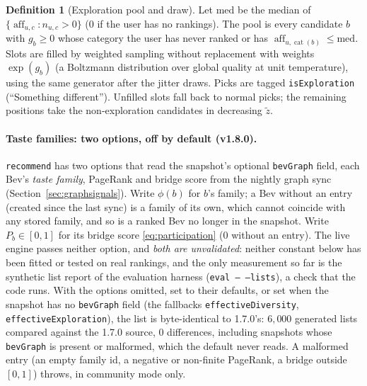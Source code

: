 \documentclass[11pt]{article}
\DeclareMathOperator{\aff}{aff}
\DeclareMathOperator{\cat}{cat}
\newcommand{\code}[1]{\texttt{#1}}
\theoremstyle{plain}
\theoremstyle{definition}
\newtheorem{definition}[theorem]{Definition}
\theoremstyle{remark}
\begin{document}
\begin{definition}[Exploration pool and draw]
Let $\mathrm{med}$ be the median of $\{\aff_{u,c} : n_{u,c} > 0\}$ ($0$ if the user has no rankings). The pool is every candidate $b$ with $g_b \ge 0$ whose category the user has never ranked or has $\aff_{u,\cat(b)} \le \mathrm{med}$. Slots are filled by weighted sampling without replacement with weights $\exp(g_b)$ (a Boltzmann distribution over global quality at unit temperature), using the same generator after the jitter draws. Picks are tagged \code{isExploration} (``Something different''). Unfilled slots fall back to normal picks; the remaining positions take the non-exploration candidates in decreasing $\tilde z$.
\end{definition}

\paragraph{Taste families: two options, off by default (v1.8.0).} \code{recommend} has two options that read the snapshot's optional \code{bevGraph} field, each Bev's \emph{taste family}, PageRank and bridge score from the nightly graph sync (Section~\ref{sec:graphsignals}). Write $\phi(b)$ for $b$'s family; a Bev without an entry (created since the last sync) is a family of its own, which cannot coincide with any stored family, and so is a ranked Bev no longer in the snapshot. Write $P_b \in [0, 1]$ for its bridge score \eqref{eq:participation} (0 without an entry). The live engine passes neither option, and \emph{both are unvalidated}: neither constant below has been fitted or tested on real rankings, and the only measurement so far is the synthetic list report of the evaluation harness (\code{eval -- --lists}), a check that the code runs. With the options omitted, set to their defaults, or set when the snapshot has no \code{bevGraph} field (the fallbacks \code{effectiveDiversity}, \code{effectiveExploration}), the list is byte-identical to 1.7.0's: $6{,}000$ generated lists compared against the 1.7.0 source, $0$ differences, including snapshots whose \code{bevGraph} is present or malformed, which the default never reads. A malformed entry (an empty family id, a negative or non-finite PageRank, a bridge outside $[0, 1]$) throws, in community mode only.
\end{document}
